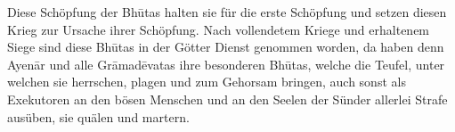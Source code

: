 \documentclass{article}
\begin{document}
Diese Schöpfung der Bh\={u}tas halten sie für die erste Schöpfung und setzen diesen Krieg zur Ursache ihrer Schöpfung. Nach vollendetem Kriege und erhaltenem Siege sind diese Bh\={u}tas in der Götter Dienst genommen worden, da haben denn Ayen\={a}r und alle Gr\={a}mad\={e}vatas ihre besonderen Bh\={u}tas, welche die Teufel, unter welchen sie herrschen, plagen und zum Gehorsam bringen, auch sonst als Exekutoren an den bösen Menschen und an den Seelen der Sünder allerlei Strafe ausüben, sie quälen und martern.

\begin{center}
\end{center}
\paragraph{}
\end{document}
